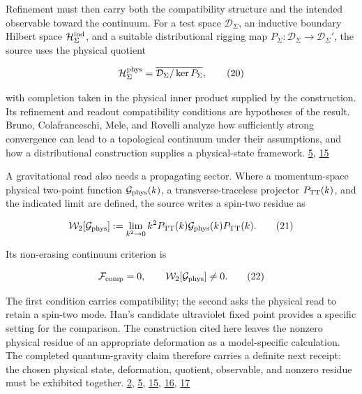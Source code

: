 Refinement must then carry both the compatibility structure and the intended observable toward the continuum. For a test space \(\mathcal D_\Sigma\), an inductive boundary Hilbert space \(\mathcal H_\Sigma^{\rm ind}\), and a suitable distributional rigging map \(P_\Sigma:\mathcal D_\Sigma\to\mathcal D_\Sigma'\), the source uses the physical quotient

\[
\mathcal H_\Sigma^{\rm phys}
=\overline{\mathcal D_\Sigma/\ker P_\Sigma},
\tag{20}
\]

with completion taken in the physical inner product supplied by the construction. Its refinement and readout compatibility conditions are hypotheses of the result. Bruno, Colafranceschi, Mele, and Rovelli analyze how sufficiently strong convergence can lead to a topological continuum under their assumptions, and how a distributional construction supplies a physical-state framework. \href{https://github.com/Coppalini-Architecture/coppalini-architecture/blob/9b7122ca5c3712c2c294e2bc5097276d0ba9817b/papers/continuum-closure-covariant-lqg/continuum-closure-covariant-lqg-v1.1.pdf}{5}, \href{https://doi.org/10.1103/7493-9nb7}{15}

A gravitational read also needs a propagating sector. Where a momentum-space physical two-point function \(\mathcal G_{\rm phys}(k)\), a transverse-traceless projector \(P_{\rm TT}(k)\), and the indicated limit are defined, the source writes a spin-two residue as

\[
\mathcal W_2[\mathcal G_{\rm phys}]
:=\lim_{k^2\to0}
k^2P_{\rm TT}(k)\mathcal G_{\rm phys}(k)P_{\rm TT}(k).
\tag{21}
\]

Its non-erasing continuum criterion is

\[
\mathcal F_{\rm comp}=0,
\qquad
\mathcal W_2[\mathcal G_{\rm phys}]\ne0.
\tag{22}
\]

The first condition carries compatibility; the second asks the physical read to retain a spin-two mode. Han's candidate ultraviolet fixed point provides a specific setting for the comparison. The construction cited here leaves the nonzero physical residue of an appropriate deformation as a model-specific calculation. The completed quantum-gravity claim therefore carries a definite next receipt: the chosen physical state, deformation, quotient, observable, and nonzero residue must be exhibited together. \href{https://doi.org/10.5281/zenodo.23697265}{2}, \href{https://github.com/Coppalini-Architecture/coppalini-architecture/blob/9b7122ca5c3712c2c294e2bc5097276d0ba9817b/papers/continuum-closure-covariant-lqg/continuum-closure-covariant-lqg-v1.1.pdf}{5}, \href{https://doi.org/10.1103/7493-9nb7}{15}, \href{https://doi.org/10.1103/d8s7-jqfl}{16}, \href{https://doi.org/10.1088/1361-6382/acc5d9}{17}

